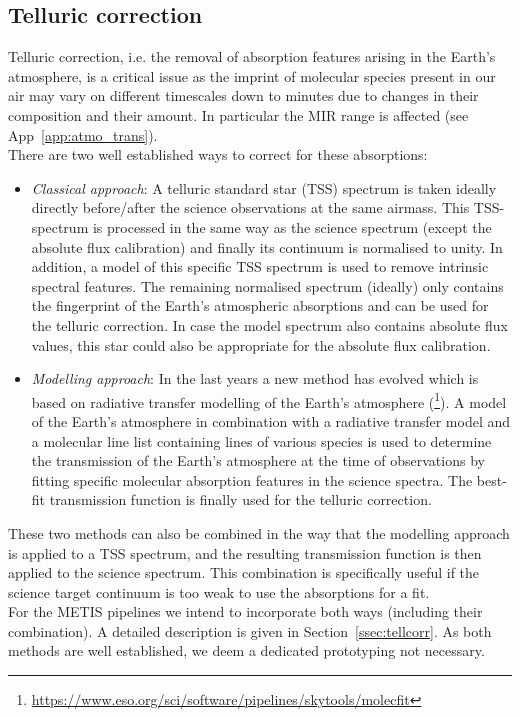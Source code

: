 \subsection{Telluric correction}\label{ssec:criticaltelluriccorrection}
Telluric correction, i.e. the removal of absorption features arising in the Earth's atmosphere, is a critical issue as the imprint of molecular species present in our air may vary on different timescales down to minutes due to changes in their composition and their amount. In particular the \ac{MIR} range is affected (see App~\ref{app:atmo_trans}).\\
There are two well established ways to correct for these absorptions:
\begin{itemize}
    \item \textit{Classical approach}: A telluric standard star (\ac{TSS}) spectrum is taken ideally directly before/after the science observations at the same airmass. This \ac{TSS}-spectrum is processed in the same way as the science spectrum (except the absolute flux calibration) and finally its continuum is normalised to unity. In addition, a model of this specific \ac{TSS} spectrum is used to remove intrinsic spectral features. The remaining normalised spectrum (ideally) only contains the fingerprint of the Earth's atmospheric absorptions and can be used for the telluric correction. In case the model spectrum also contains absolute flux values, this star could also be appropriate for the absolute flux calibration.
    \item \textit{Modelling approach}: In the last years a new method has evolved which is based on radiative transfer modelling of the Earth's atmosphere (\cite{mf1, mf2, molecfit}\footnote{\url{https://www.eso.org/sci/software/pipelines/skytools/molecfit}}). A model of the Earth's atmosphere in combination with a radiative transfer model and a molecular line list containing lines of various species is used to determine the transmission of the Earth's atmosphere at the time of observations by fitting specific molecular absorption features in the science spectra. The best-fit transmission function is finally used for the telluric correction.
\end{itemize}
These two methods can also be combined in the way that the modelling approach is applied to a \ac{TSS} spectrum, and the resulting transmission function is then applied to the science spectrum. This combination is specifically useful if the science target continuum is too weak to use the absorptions for a fit.\\
For the \ac{METIS} pipelines we intend to incorporate both ways (including their combination). A detailed description is given in Section~\ref{ssec:tellcorr}. As both methods are well established, we deem a dedicated prototyping not necessary.

